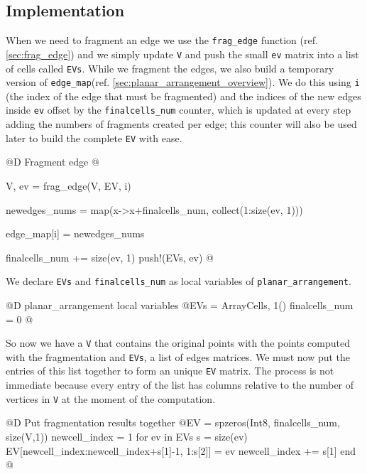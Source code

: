 \subsection{Implementation}

When we need to fragment an edge we use the \texttt{frag\_edge} function (ref. \ref{sec:frag_edge}) 
and we simply update \texttt{V} and push the small \texttt{ev} matrix into a list of cells called \texttt{EVs}.
While we fragment the edges, we also build a temporary version of \texttt{edge\_map}(ref. \ref{sec:planar_arrangement_overview}). We do this using \texttt{i}
(the index of the edge that must be fragmented) and the indices of the new edges inside \texttt{ev}
offset by the \texttt{finalcells\_num} counter, which is updated at every step adding the numbers of
fragments created per edge; this counter will also be used later to build the complete \texttt{EV} with ease.

@D Fragment edge
@{V, ev = frag_edge(V, EV, i)

newedges_nums = map(x->x+finalcells_num, collect(1:size(ev, 1)))

edge_map[i] = newedges_nums

finalcells_num += size(ev, 1)
push!(EVs, ev)
@}

We declare \texttt{EVs} and \texttt{finalcells\_num} as local variables of \texttt{planar\_arrangement}.

@D planar\_arrangement local variables
@{EVs = Array{Cells, 1}()
finalcells_num = 0
@}

So now we have a \texttt{V} that contains the original points with the points computed with the fragmentation
and \texttt{EVs}, a list of edges matrices. We must now put the entries of this list together to form an unique
\texttt{EV} matrix. The process is not immediate because every entry of the list has columns relative to the 
number of vertices in \texttt{V} at the moment of the computation.

@D Put fragmentation results together
@{EV = spzeros(Int8, finalcells_num, size(V,1))
newcell_index = 1
for ev in EVs
    s = size(ev)
    EV[newcell_index:newcell_index+s[1]-1, 1:s[2]] = ev
    newcell_index += s[1]
end
@}

